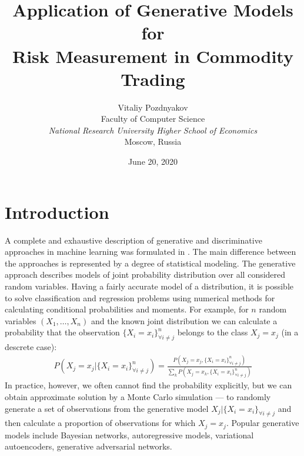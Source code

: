 \documentclass{article}
\title{Application of Generative Models for \\Risk Measurement in Commodity Trading}
\date{June 20, 2020}
\author{
    \small Vitaliy Pozdnyakov \\
    \small Faculty of Computer Science \\
    \small  \textit{National Research University Higher School of Economics} \\
    \small Moscow, Russia\\
    }
\begin{document}
\maketitle


\tableofcontents

\newpage

\section{Introduction}
A complete and exhaustive description of generative and discriminative approaches in machine learning was formulated in \cite{jebara}. The main difference between the approaches is represented by a degree of statistical modeling. The generative approach describes models of joint probability distribution over all considered random variables. Having a fairly accurate model of a distribution, it is possible to solve classification and regression problems using numerical methods for calculating conditional probabilities and moments. For example, for $n$ random variables $(X_1, \dots, X_n)$ and the known joint distribution we can calculate a probability that the observation $\{X_i = x_i\}_{\forall i \neq j}^{n}$ belongs to the class $X_j = x_j$ (in a descrete case): 
\begin{align*}
    P(X_j = x_j| \{X_i = x_i\}_{\forall i \neq j}^n) =
\frac{P(X_j = x_j, \{X_i = x_i\}_{\forall i \neq j}^n)}{\sum_{k} P(X_j = x_k, \{X_i = x_i\}_{\forall i \neq j}^n)}
\end{align*}
In practice, however, we often cannot find the probability explicitly, but we can obtain approximate solution by a Monte Carlo simulation — to randomly generate a set of observations from the generative model $X_j| \{X_i = x_i\}_{\forall i \neq j}$ and then calculate a proportion of observations for which $X_j = x_j$. Popular generative models include Bayesian networks, autoregressive models, variational autoencoders, generative adversarial networks.
\end{document}

